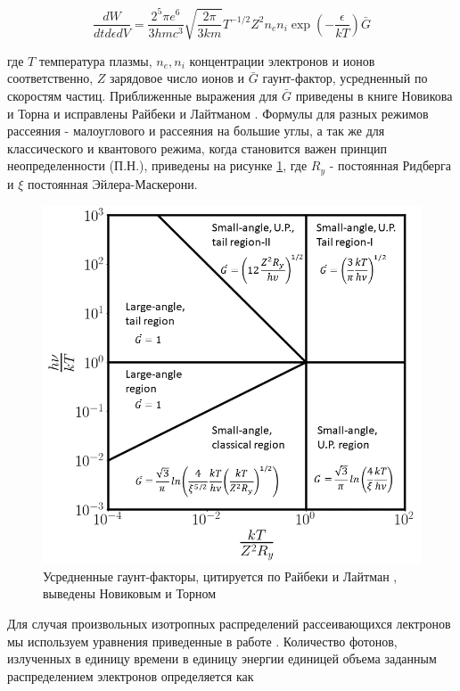 \begin{equation}
	\frac{dW}{dt d\epsilon dV} = \frac{2^5 \pi e^6}{3 h m c^3}\sqrt{\frac{2\pi}{3 k m}}T^{-1/2}Z^2n_e n_i\exp\left(-\frac{\epsilon}{kT}\right)\bar{G}
\end{equation}

где $T$ температура плазмы, $n_e, n_i$ концентрации электронов и ионов соответственно, $Z$ зарядовое число ионов и $\bar{G}$ гаунт-фактор, усредненный по скоростям частиц. Приближенные выражения для $\bar{G}$ приведены в книге Новикова и Торна \cite{NovikovThorne} и исправлены Райбеки и Лайтманом \cite{Rybicki}. Формулы для разных режимов рассеяния - малоуглового и рассеяния на большие углы, а так же для классического и квантового режима, когда становится важен принцип неопределенности (П.Н.), приведены на рисунке \ref{gaunt}, где $R_y$ - постоянная Ридберга и $\xi$ постоянная Эйлера-Маскерони.

\begin{figure}
	\centering
	\includegraphics[width=11.5 cm]{./fig/gaunt.png} 
	\caption{Усредненные гаунт-факторы, цитируется по Райбеки и Лайтман \cite{Rybicki}, выведены Новиковым и Торном \cite{NovikovThorne}}
	\label{gaunt}
\end{figure}

Для случая произвольных изотропных распределений рассеивающихся лектронов мы используем уравнения приведенные в работе \cite{Baring1999}. Количество фотонов, излученных в единицу времени в единицу энергии единицей объема заданным распределением электронов определяется как

